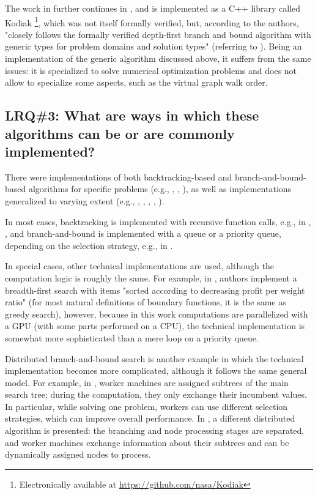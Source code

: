 The work in \cite{narkawicz2013formalnasa} further continues in \cite{smith2015rigorous},
and is implemented as a C++ library called
Kodiak \footnote{Electronically available at \url{https://github.com/nasa/Kodiak}},
which was not itself formally verified, but, according to the authors, "closely follows
the formally verified depth-first branch and bound algorithm with generic types for problem domains
and solution types" (referring to \cite{narkawicz2013formalnasa}). Being an implementation of the
generic algorithm discussed above, it suffers from the same issues: it is specialized to solve
numerical optimization problems and does not allow to specialize some aspects, such as the
virtual graph walk order.

\subsection{LRQ\#3: What are ways in which these algorithms can be or are commonly implemented?}

There were implementations of both backtracking-based and branch-and-bound-based algorithms
for specific problems
(e.g., \cite{bard1990bilevel}, \cite{breuel2003geometric}, \cite{lalami2012gpu}),
as well as implementations generalized to varying extent
(e.g., \cite{narkawicz2013formalnasa}, \cite{smirnov2017concur}, \cite{finkel1987distrib},
\cite{prenner1972proglangs}, \cite{johnson1988modular}).

In most cases, backtracking is implemented with recursive function calls,
e.g., in \cite{narkawicz2013formalnasa}, \cite{bard1990bilevel},
and branch-and-bound is implemented with a queue or a priority queue,
depending on the selection strategy, e.g., in \cite{breuel2003geometric}.

In special cases, other technical implementations are used, although the computation logic
is roughly the same. For example, in \cite{lalami2012gpu}, authors implement a
breadth-first search with items "sorted according to decreasing profit per weight ratio"
(for most natural definitions of boundary functions, it is the same as greedy search),
however, because in this work computations are parallelized with a GPU
(with some parts performed on a CPU), the technical implementation is somewhat more
sophisticated than a mere loop on a priority queue.

Distributed branch-and-bound search is another example in which the technical implementation
becomes more complicated, although it follows the same general model. For example,
in \cite{smirnov2017concur}, worker machines are assigned subtrees of the main search tree;
during the computation, they only exchange their incumbent values. In particular, while solving one
problem, workers can use different selection strategies, which can improve overall performance.
In \cite{finkel1987distrib}, a different distributed algorithm is presented: the branching and
node processing stages are separated, and worker machines exchange information about their
subtrees and can be dynamically assigned nodes to process.


